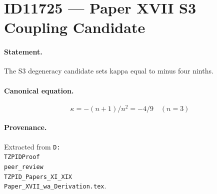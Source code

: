 \section*{ID11725 --- Paper XVII S3 Coupling Candidate}

\paragraph{Statement.}
The S3 degeneracy candidate sets kappa equal to minus four ninths.

\paragraph{Canonical equation.}
\[
\kappa=-(n+1)/n^2=-4/9\quad(n=3)
\]

\paragraph{Provenance.}
Extracted from \texttt{D:\\TZPIDProof\\peer\_review\\TZPID\_Papers\_XI\_XIX\\Paper\_XVII\_wa\_Derivation.tex}.
